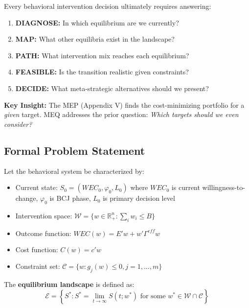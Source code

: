 \begin{tcolorbox}[colback=blue!5!white, colframe=blue!75!black,
    title=The Five Questions of Strategic Navigation]

Every behavioral intervention decision ultimately requires answering:

\begin{enumerate}
    \item \textbf{DIAGNOSE:} In which equilibrium are we currently?
    \item \textbf{MAP:} What other equilibria exist in the landscape?
    \item \textbf{PATH:} What intervention mix reaches each equilibrium?
    \item \textbf{FEASIBLE:} Is the transition realistic given constraints?
    \item \textbf{DECIDE:} What meta-strategic alternatives should we present?
\end{enumerate}

\textbf{Key Insight:} The MEP (Appendix V) finds the cost-minimizing portfolio
for a \textit{given} target. MEQ addresses the prior question: \textit{Which
targets should we even consider?}

\end{tcolorbox}

\subsection{Formal Problem Statement}

Let the behavioral system be characterized by:
\begin{itemize}[nosep]
    \item Current state: $S_0 = (WEC_0, \varphi_0, L_0)$ where $WEC_0$ is current
          willingness-to-change, $\varphi_0$ is BCJ phase, $L_0$ is primary decision level
    \item Intervention space: $\mathcal{W} = \{w \in \mathbb{R}^n_+ : \sum_i w_i \leq B\}$
    \item Outcome function: $WEC(w) = E'w + w'\Gamma^{eff}w$
    \item Cost function: $C(w) = c'w$
    \item Constraint set: $\mathcal{C} = \{w : g_j(w) \leq 0, j = 1,...,m\}$
\end{itemize}

The \textbf{equilibrium landscape} is defined as:
\begin{equation}
\boxed{
\mathcal{E} = \left\{ S^* : S^* = \lim_{t \to \infty} S(t; w^*) \text{ for some } w^* \in \mathcal{W} \cap \mathcal{C} \right\}
}
\end{equation}

